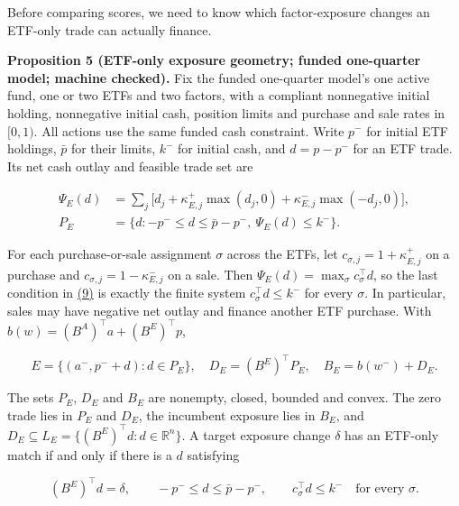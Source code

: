 \documentclass[11pt]{article}
\begin{document}
Before comparing scores, we need to know which factor-exposure
changes an ETF-only trade can actually finance.

\label{res:Proposition-5}
\textbf{Proposition 5 (ETF-only exposure geometry; funded one-quarter model; machine checked).}
Fix the funded one-quarter model's one active fund, one or two ETFs and
two factors, with a compliant
nonnegative initial holding, nonnegative initial cash, position limits and
purchase and sale rates in \([0,1)\). All actions use the same funded cash
constraint. Write \(p^-\) for initial ETF holdings, \(\bar p\) for their limits,
\(k^-\) for initial cash, and \(d=p-p^-\) for an ETF trade. Its net cash
outlay and feasible trade set are

\begin{equation*}
\begin{aligned}
\Psi_E(d)&=\sum_j\bigl[d_j+\kappa^+_{E,j}\max(d_j,0)
                         +\kappa^-_{E,j}\max(-d_j,0)\bigr],\\
P_E&=\{d:-p^-\leq d\leq\bar p-p^-,\ \Psi_E(d)\leq k^-\}.
\end{aligned}                                           \tag{9}\label{eq:9}
\end{equation*}

For each purchase-or-sale assignment \(\sigma\) across the ETFs, let
\(c_{\sigma,j}=1+\kappa^+_{E,j}\) on a purchase and
\(c_{\sigma,j}=1-\kappa^-_{E,j}\) on a sale. Then
\(\Psi_E(d)=\max_\sigma c_\sigma^\top d\), so the last condition in \hyperref[eq:9]{(9)}
is exactly the finite system \(c_\sigma^\top d\leq k^-\) for every
\(\sigma\). In particular, sales may have negative net outlay and finance
another ETF purchase. With \(b(w)=(B^A)^\top a+(B^E)^\top p\),

\begin{equation*}
E=\{(a^-,p^-+d):d\in P_E\},\quad
D_E=(B^E)^\top P_E,\quad B_E=b(w^-)+D_E.                 \tag{10}\label{eq:10}
\end{equation*}

The sets \(P_E\), \(D_E\) and \(B_E\) are nonempty, closed, bounded and convex.
The zero trade lies in \(P_E\) and \(D_E\), the incumbent exposure lies
in \(B_E\), and \(D_E\subseteq L_E=\{(B^E)^\top d:d\in\mathbb R^n\}\).
A target exposure change \(\delta\) has an ETF-only match if and only if
there is a \(d\) satisfying

\begin{equation*}
(B^E)^\top d=\delta,\qquad
-p^-\leq d\leq\bar p-p^-,\qquad
c_\sigma^\top d\leq k^-\quad\text{for every }\sigma.    \tag{11}\label{eq:11}
\end{equation*}
\end{document}
